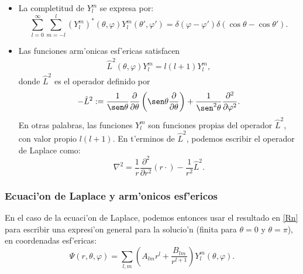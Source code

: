 \begin{itemize}
\item La completitud de $Y_l^m $ se expresa por:
\begin{equation}
    \sum_{l=0}^\infty\sum_{m=-l}^l (Y_l^m)^*(\theta,\varphi)
    Y_l^m (\theta',\varphi') = \delta(\varphi-\varphi')\delta(\cos\theta-
    \cos\theta').
\end{equation}
\item Las  funciones arm'onicas esf'ericas satisfacen
 \begin{eqnarray}
  \hat{L}^2(\theta,\varphi) Y_l^m  = l(l+1)Y_l^m ,
 \end{eqnarray}
donde $\hat{L}^2$ es el operador definido por
 \begin{eqnarray}
  -\hat{L}^2 :=
\frac{1}{\sen\theta}\frac{\partial}{\partial\theta}\left(\sen\theta\frac{
\partial}{\partial
  \theta}\right)+\frac 1{\sen^2\theta}\frac{\partial^2}{\partial \varphi^2}.
 \end{eqnarray}
 En otras palabras, las funciones $Y_l^m $ son funciones propias del operador
$\hat{L}^2$, con valor propio $l(l+1)$. En t'erminos de $\hat{L}^2$, podemos
escribir el operador de Laplace como:
 \begin{equation}
  \nabla^2 = \frac 1r\frac{\partial^2}{\partial r^2}\left( r \cdot\right) -
\frac{1}{r^2}\hat{L}^2.
\end{equation}
 \end{itemize}

\subsubsection{Ecuaci'on de Laplace y arm'onicos esf'ericos}
En el caso de la ecuaci'on de Laplace, podemos entonces usar el resultado en \eqref{Rn} para escribir una expresi'on general para la solucio'n (finita para $\theta=0$ y $\theta=\pi$), en coordenadas esf'ericas:
\begin{equation}
\Psi(r,\theta,\varphi)=\sum_{l,m}\left(A_{lm}r^l+\frac{B_{lm}}{r^{l+1}}\right)Y_l^m(\theta,\varphi).
\end{equation}